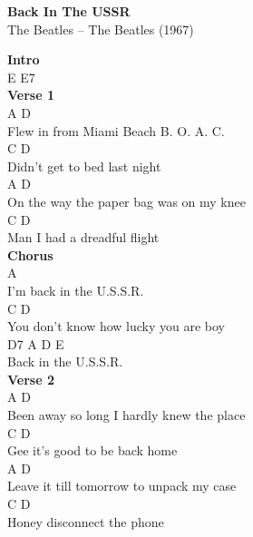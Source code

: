 \documentclass[a4paper]{article}
\begin{document}
    \begin{center}
        \textbf{Back In The USSR}
        ~\\
        The Beatles -- The Beatles (1967)
    \end{center}
    {
        \scriptsize
        \textbf{Intro}
        ~\\
        {
            \cutive
            \obeyspaces
E  E7
\\

        }
        \textbf{Verse 1}
        ~\\
        {
            \cutive
            \obeyspaces
A                        D
\\
Flew in from Miami Beach B. O. A. C.
\\
C                      D
\\
Didn't get to bed last night
\\
A                            D
\\
On the way the paper bag was on my knee
\\
C                    D
\\
Man I had a dreadful flight
\\

        }
        \textbf{Chorus}
        ~\\
        {
            \cutive
            \obeyspaces
                      A
\\
I'm back in the U.S.S.R.
\\
C                            D
\\
You don't know how lucky you are boy
\\
D7                A  D E
\\
Back in the U.S.S.R.
\\

        }
        \textbf{Verse 2}
        ~\\
        {
            \cutive
            \obeyspaces
A                          D
\\
Been away so long I hardly knew the place
\\
C                        D
\\
Gee it's good to be back home
\\
A                           D
\\
Leave it till tomorrow to unpack my case
\\
C                    D
\\
Honey disconnect the phone
\\

}}
\end{document}
